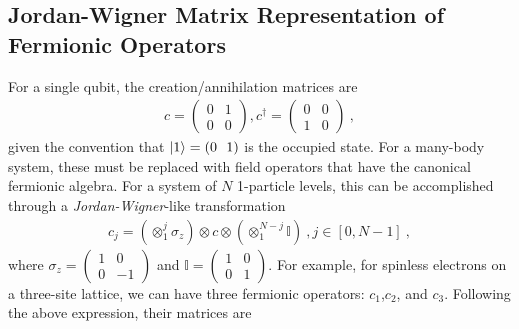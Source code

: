 \documentclass[reprint]{revtex4-2}
\begin{document}
\subsection{Jordan-Wigner Matrix Representation of Fermionic Operators}
For a single qubit, the creation/annihilation matrices are
\begin{equation}\begin{aligned}
	c = \begin{pmatrix}0 & 1 \\ 0 & 0\end{pmatrix}, c^\dagger = \begin{pmatrix}0 & 0 \\ 1 & 0\end{pmatrix}~,
\end{aligned}\end{equation}
given the convention that \(\ket{1} = (0 ~ ~ 1)\) is the occupied state. For a many-body system, these must be replaced with field operators that have the canonical fermionic algebra. For a system of \(N\) 1-particle levels, this can be accomplished through a {\it Jordan-Wigner}-like transformation
\begin{equation}\begin{aligned}
	c_j = \left(\otimes_1^j \sigma_z\right) \otimes c \otimes \left(\otimes_1^{N-j} \mathbb{I}\right) ~, j \in [0, N-1]~,
\end{aligned}\end{equation}
where \(\sigma_z = \begin{pmatrix} 1 & 0 \\ 0 & -1 \end{pmatrix} \) and \(\mathbb{I} = \begin{pmatrix} 1 & 0 \\ 0 & 1 \end{pmatrix} \). For example, for spinless electrons on a three-site lattice, we can have three fermionic operators: \(c_{1}\),\(c_{2}\), and \(c_{3}\). Following the above expression, their matrices are\\
\end{document}
